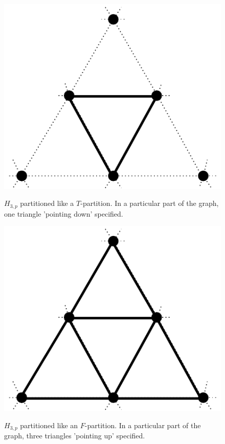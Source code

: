 \documentclass[runningheads,a4paper]{llncs}
\begin{document}
\begin{figure}
\begin{minipage}{0.5\linewidth}
\centering
\includegraphics[scale=0.5]{Tpartition.pdf}
\label{fig:tpart}
\caption{$H_{3,p}$ partitioned like a $T$-partition. In a particular part of the graph, one triangle 'pointing down' specified.}
\end{minipage}
\hfill
\begin{minipage}{0.5\linewidth}
\centering
\label{fig:fpart}
\includegraphics[scale=0.5]{Fpartition.pdf}
\caption{$H_{3,p}$ partitioned like an $F$-partition. In a particular part of the graph, three triangles 'pointing up' specified.}
\end{minipage}
\end{figure}
\end{document}
